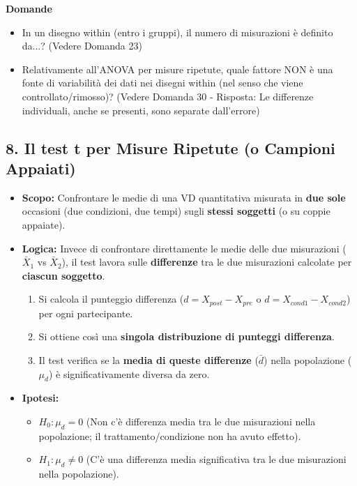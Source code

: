 \documentclass[12pt, a4paper]{article}
\newenvironment{reflectionbox}{%
    \medskip
    \begin{framed}\par\noindent
    \textbf{\color{boxtitlecolor}Domande} \par
    \begin{itemize}[leftmargin=*, label=$\blacktriangleright$]
}{%
    \end{itemize}\par
    \end{framed}
    \medskip
}
\newcommand{\Hnull}{H_0} %
\newcommand{\Halt}{H_1} %
\begin{document}
\begin{reflectionbox}
    \item In un disegno within (entro i gruppi), il numero di misurazioni è definito da...? (Vedere Domanda 23)
    \item Relativamente all'ANOVA per misure ripetute, quale fattore NON è una fonte di variabilità dei dati nei disegni within (nel senso che viene controllato/rimosso)? (Vedere Domanda 30 - Risposta: Le differenze individuali, anche se presenti, sono separate dall'errore)
\end{reflectionbox}


\subsection*{8. Il test t per Misure Ripetute (o Campioni Appaiati)}
\begin{itemize}
    \item \textbf{Scopo:} Confrontare le medie di una VD quantitativa misurata in \textbf{due sole} occasioni (due condizioni, due tempi) sugli \textbf{stessi soggetti} (o su coppie appaiate).
    \item \textbf{Logica:} Invece di confrontare direttamente le medie delle due misurazioni ($\bar{X}_1$ vs $\bar{X}_2$), il test lavora sulle \textbf{differenze} tra le due misurazioni calcolate per \textbf{ciascun soggetto}.
        \begin{enumerate}
            \item Si calcola il punteggio differenza ($d = X_{post} - X_{pre}$ o $d = X_{cond1} - X_{cond2}$) per ogni partecipante.
            \item Si ottiene così una \textbf{singola distribuzione di punteggi differenza}.
            \item Il test verifica se la \textbf{media di queste differenze} ($\bar{d}$) nella popolazione ($\mu_d$) è significativamente diversa da zero.
        \end{enumerate}
    \item \textbf{Ipotesi:}
        \begin{itemize}
            \item $\Hnull: \mu_d = 0$ (Non c'è differenza media tra le due misurazioni nella popolazione; il trattamento/condizione non ha avuto effetto).
            \item $\Halt: \mu_d \neq 0$ (C'è una differenza media significativa tra le due misurazioni nella popolazione).
        \end{itemize}

\end{itemize}
\end{document}
